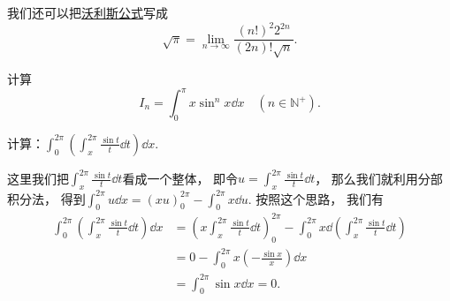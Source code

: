 我们还可以把\hyperref[equation:定积分.沃利斯公式]{沃利斯公式}写成\begin{equation}
	\sqrt\pi
	= \lim_{n\to\infty} \frac{(n!)^2 2^{2n}}{(2n)! \sqrt{n}}.
\end{equation}

\begin{example}
计算\[
	I_n = \int_0^\pi x \sin^n x \dd{x}
	\quad(n\in\mathbb{N}^+).
\]
\end{example}

\begin{example}
计算：\(\int_0^{2\pi}\left(\int_x^{2\pi}\frac{\sin t}{t}\dd{t}\right)\dd{x}\).
\begin{solution}
这里我们把\(\int_x^{2\pi}\frac{\sin t}{t}\dd{t}\)看成一个整体，
即令\(u = \int_x^{2\pi}\frac{\sin t}{t}\dd{t}\)，
那么我们就利用分部积分法，
得到\(\int_0^{2\pi} u \dd{x} = (x u)_0^{2\pi} - \int_0^{2\pi} x \dd{u}\).
按照这个思路，
我们有\begin{align*}
	\int_0^{2\pi}\left(\int_x^{2\pi}\frac{\sin t}{t}\dd{t}\right)\dd{x}
	&= \left(x \int_x^{2\pi}\frac{\sin t}{t}\dd{t}\right)_0^{2\pi}
	- \int_0^{2\pi} x \dd(\int_x^{2\pi}\frac{\sin t}{t}\dd{t}) \\
	&= 0 - \int_0^{2\pi} x \left(-\frac{\sin x}{x}\right) \dd{x} \\
	&= \int_0^{2\pi} \sin x \dd{x} = 0.
\end{align*}
\end{solution}
\end{example}
